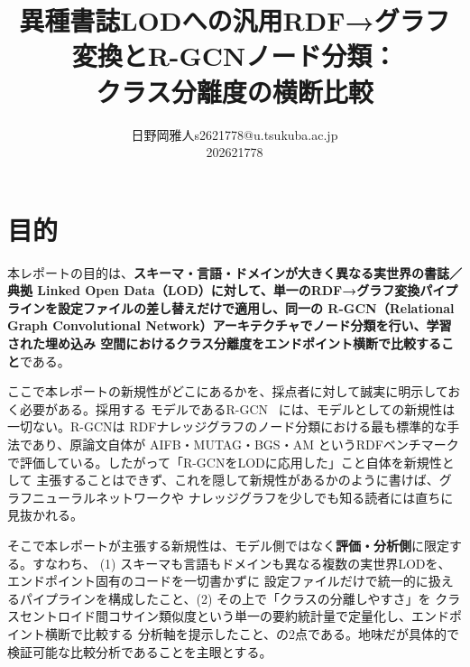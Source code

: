\documentclass[dvipdfmx,twoside,11pt]{article}
\makeatletter
\newcommand\studentName{日野岡雅人}                  %
\newcommand\studentEmail{s2621778@u.tsukuba.ac.jp}          %
\newcommand\studentNumber{202621778}                %
\newcommand{\repourl}{{\ttfamily\scriptsize https://github.com/terasaki-8910/MLPR\_final\_report.git}}
\makeatother
\begin{document}
    \title{異種書誌LODへの汎用RDF→グラフ変換とR-GCNノード分類：\\クラス分離度の横断比較}

    \author{\name \studentName \email \studentEmail \\
    \studentNumber
    \addr
    }


    \maketitle

\makeatletter
\def\@oddfoot{{\repourl}\hfil{\rm\thepage}}%
\def\@evenfoot{{\rm\thepage}\hfil{\repourl}}%
\makeatother

\section{目的}
\label{sec:purpose}

本レポートの目的は、\textbf{スキーマ・言語・ドメインが大きく異なる実世界の書誌／典拠 Linked Open
Data（LOD）に対して、単一のRDF→グラフ変換パイプラインを設定ファイルの差し替えだけで適用し、同一の
R-GCN（Relational Graph Convolutional Network）アーキテクチャでノード分類を行い、学習された埋め込み
空間におけるクラス分離度をエンドポイント横断で比較すること}である。

ここで本レポートの新規性がどこにあるかを、採点者に対して誠実に明示しておく必要がある。採用する
モデルであるR-GCN~\citep{schlichtkrull2018modeling} には、モデルとしての新規性は一切ない。R-GCNは
RDFナレッジグラフのノード分類における最も標準的な手法であり、原論文自体が AIFB・MUTAG・BGS・AM
というRDFベンチマークで評価している。したがって「R-GCNをLODに応用した」こと自体を新規性として
主張することはできず、これを隠して新規性があるかのように書けば、グラフニューラルネットワークや
ナレッジグラフを少しでも知る読者には直ちに見抜かれる。

そこで本レポートが主張する新規性は、モデル側ではなく\textbf{評価・分析側}に限定する。すなわち、
(1) スキーマも言語もドメインも異なる複数の実世界LODを、エンドポイント固有のコードを一切書かずに
設定ファイルだけで統一的に扱えるパイプラインを構成したこと、(2) その上で「クラスの分離しやすさ」を
クラスセントロイド間コサイン類似度という単一の要約統計量で定量化し、エンドポイント横断で比較する
分析軸を提示したこと、の2点である。地味だが具体的で検証可能な比較分析であることを主眼とする。
\end{document}
